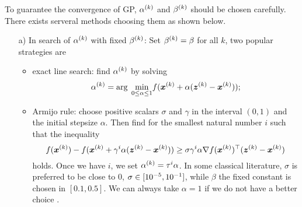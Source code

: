 To guarantee the convergence of GP, $\alpha^{(k)}$ and $\beta^{(k)}$
should be chosen carefully.
There exists serveral methods choosing them as shown below.
\begin{itemize}
    \item [a)] In search of $\alpha^{(k)}$ with fixed $\beta^{(k)}$: \newline
               Set $\beta^{(k)} = \beta$ for all $k$, two popular strategies
               are
               \begin{itemize}
                   \item exact line search: find $\alpha^{(k)}$ by solving
                         \begin{equation}
                             \alpha^{(k)} =
                             \arg\;\underset{0 \leq \alpha \leq 1}{\min}
                             f(\bm x^{(k)} + \alpha(\bm z^{(k)} -
                                                      \bm x^{(k)}));
                             \label{eq:find_alpha_exlnsrch}
                         \end{equation}
                   \item Armijo rule: choose positive scalars $\sigma$ and
                         $\gamma$ in the interval $(0,1)$ and the initial
                         stepsize $\alpha$.
                         Then find for the smallest natural number $i$ such
                         that the inequality
                         \begin{equation}
                             f(\bm x^{(k)}) -
                             f(\bm x^{(k)} +
                               \gamma^i\alpha(\bm z^{(k)} - \bm x^{(k)})) \geq
                             \sigma \gamma^i \alpha
                             \nabla f(\bm x^{(k)})^\top
                             (\bm z^{(k)} - \bm x^{(k)})
                             \label{eq:find_alpha_Armijo}
                         \end{equation}
                         holds.
                         Once we have $i$, we set $\alpha^{(k)} = \tau^i\alpha$.
                         In some classical literature, $\sigma$ is preferred
                         to be close to 0, \ie $\sigma \in [10^{-5},10^{-1}]$,
                         while $\beta$ the fixed constant is chosen in
                         $[0.1,0.5]$.
                         We can always take $\alpha = 1$ if we do not have a
                         better choice \cite{NONLINEAR_PRGM}.
               \end{itemize}

\end{itemize}
